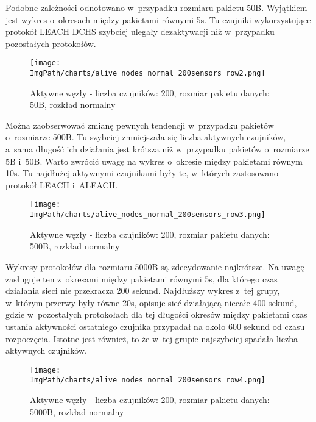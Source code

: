 Podobne zależności odnotowano w~przypadku rozmiaru pakietu 50B. Wyjątkiem jest wykres o~okresach między pakietami równymi 5s. Tu czujniki wykorzystujące protokół LEACH DCHS szybciej ulegały dezaktywacji niż w~przypadku pozostałych protokołów. 

\begin{figure}[H]
	\begin{center}
		\texttt{[image: \\ImgPath/charts/alive\_nodes\_normal\_200sensors\_row2.png]}
	\end{center}
	\caption{Aktywne węzły - liczba czujników: 200, rozmiar pakietu danych: 50B, rozkład normalny}
\end{figure}


Można zaobserwować zmianę pewnych tendencji w~przypadku pakietów o~rozmiarze 500B. Tu szybciej zmniejszała się liczba aktywnych czujników, a~sama długość ich działania jest krótsza niż w~przypadku pakietów o~rozmiarze 5B i~50B. Warto zwrócić uwagę na wykres o~okresie między pakietami równym 10s. Tu najdłużej aktywnymi czujnikami były te, w~których zastosowano protokół LEACH i~ALEACH.

\begin{figure}[H]
	\begin{center}
		\texttt{[image: \\ImgPath/charts/alive\_nodes\_normal\_200sensors\_row3.png]}
	\end{center}
	\caption{Aktywne węzły - liczba czujników: 200, rozmiar pakietu danych: 500B, rozkład normalny}
\end{figure}

 
Wykresy protokołów dla rozmiaru 5000B są zdecydowanie najkrótsze. Na uwagę zasługuje ten z~okresami między pakietami równymi 5s, dla którego czas działania sieci nie przekracza 200 sekund. Najdłuższy wykres z~tej grupy, w~którym przerwy były równe 20s, opisuje sieć działającą niecałe 400 sekund, gdzie w~pozostałych protokołach dla tej długości okresów między pakietami czas ustania aktywności ostatniego czujnika przypadał na około 600 sekund od czasu rozpoczęcia. Istotne jest również, to że w~tej grupie najszybciej spadała liczba aktywnych czujników.

\begin{figure}[H]
	\begin{center}
		\texttt{[image: \\ImgPath/charts/alive\_nodes\_normal\_200sensors\_row4.png]}
	\end{center}
	\caption{Aktywne węzły - liczba czujników: 200, rozmiar pakietu danych: 5000B, rozkład normalny}
\end{figure}
 


